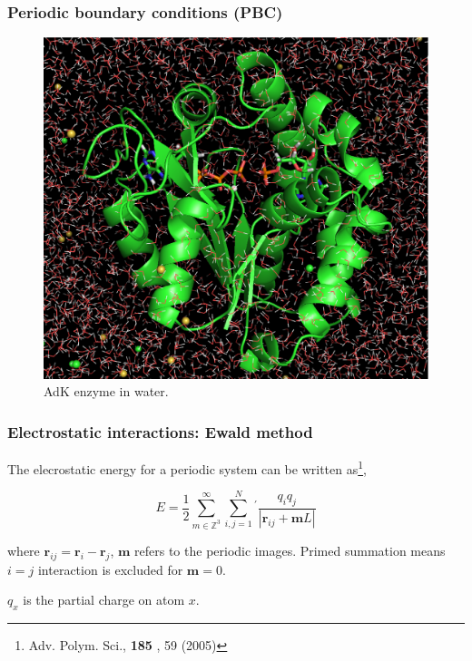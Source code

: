 \documentclass{beamer}
\begin{document}
\begin{frame}\frametitle{Periodic boundary conditions (PBC)}

\begin{figure}
\includegraphics[scale=0.17]{protein_water_ligand_ions.eps}
\caption{{\scriptsize  AdK enzyme in water.}}
\end{figure}

\end{frame}


\begin{frame}\frametitle{Electrostatic interactions: Ewald method}

The elecrostatic energy for a periodic system can be written as\footnote{{\scriptsize Adv. Polym. Sci.,  {\bf
185 }, 59 (2005)}},

\begin{equation}
	E= \frac{1}{2} \sum_{m \in \mathbb{Z}^3}^{\infty} \sum_{i,j=1}^{N}{}^{'} \frac{q_i q_j}{ |\mathbf{r}_{ij} + \mathbf{m}L| }
\end{equation}

where $\mathbf{r}_{ij} = \mathbf{r}_i -   \mathbf{r}_j$, $\mathbf{m}$ refers to the periodic 
images. Primed summation means $i=j$ interaction is excluded for $\mathbf{m}=0$.

$q_x$ is the partial charge on atom $x$.

%
%
%

\end{frame}
\end{document}
